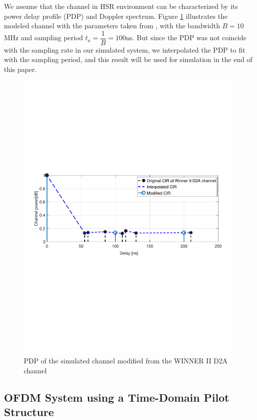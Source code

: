 \documentclass[AMA]{WileyNJD-v1}
\begin{document}
We assume that the channel in HSR environment can be characterized by its power delay profile (PDP) and Doppler spectrum. Figure \ref{fig:rhod2achannel} illustrates the modeled channel  with the parameters taken from \cite{Guan2011}, with the bandwidth $B=10$MHz and sampling period $t_a=\dfrac{1}{B}=100$ns. But since the PDP was not coincide with the sampling rate in our simulated system, we interpolated the PDP to fit with the sampling period, and this result will be used for simulation in the end of this paper.
%
\begin{figure}
		\centering
		\includegraphics[width=1.0\linewidth]{figures/ChannelPowerModified.pdf}
		\caption{PDP of the simulated channel modified from the WINNER II D2A channel}
		\label{fig:rhod2achannel}
\end{figure}
	
\subsection{OFDM System using a Time-Domain Pilot Structure}\label{section-2.2}
	
\end{document}
